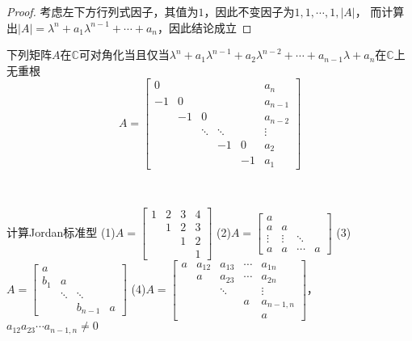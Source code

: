\begin{proof}
  考虑左下方行列式因子，其值为$1$，因此不变因子为$1,1,\cdots,1,|A|$，
  而计算出$|A| = \lambda^n + a_1 \lambda^{n-1} + \cdots + a_n $，因此结论成立
\end{proof}

\begin{corollary}
  下列矩阵$A$在$\mathbb{C}$可对角化当且仅当$\lambda^n + a_1\lambda^{n-1}+a_2\lambda^{n-2} + \cdots + a_{n-1}\lambda + a_n$在$\mathbb{C}$上无重根
  \begin{equation*}
    A = \left[
      \begin{array}{cccccc}
        0&&&&&a_n \\
        -1&0&&&&a_{n-1} \\
               &-1&0&&&a_{n-2} \\
               &&\ddots&\ddots&&\vdots \\
               &&&-1&0&a_2 \\
               &&&&-1&a_1
      \end{array}
    \right]
  \end{equation*}
\end{corollary}

~

\begin{exercise}[一些用行列式因子计算方便的特殊矩阵]
  计算Jordan标准型
  (1)$A = \left[
    \begin{array}{cccc}
      1&2&3&4 \\
       &1&2&3 \\
       &&1&2 \\
       &&&1
    \end{array}
  \right]$
  (2)$A = \left[
    \begin{array}{cccc}
      a&&& \\
       a&a&& \\
       \vdots&\vdots&\ddots& \\
       a&a&\cdots&a
    \end{array}
  \right]$
  (3)$A = \left[
    \begin{array}{cccc}
      a&&& \\
       b_1&a&& \\
       &\ddots&\ddots& \\
       &&b_{n-1}&a
    \end{array}
  \right]$
  (4)$A = \left[
    \begin{array}{ccccc}
      a&a_{12}&a_{13}&\cdots&a_{1n} \\
       &a&a_{23}&\cdots&a_{2n} \\
       &&\ddots&&\vdots \\
       &&&a&a_{n-1,n} \\
       &&&&a
    \end{array}
  \right]$，
  $a_{12}a_{23}\cdots a_{n-1,n} \neq 0$
\end{exercise}

